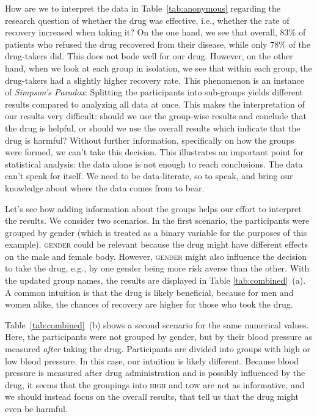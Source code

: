 \documentclass[nobib]{tufte-handout}
\begin{document}
How are we to interpret the data in Table~\ref{tab:anonymous} regarding the research question of whether the drug was effective, i.e., whether the rate of recovery increased when taking it?
On the one hand, we see that overall, 83\% of patients who refused the drug recovered from their disease, while only 78\% of the drug-takers did.
This does not bode well for our drug.
However, on the other hand, when we look at each group in isolation, we see that within each group, the drug-takers had a slightly higher recovery rate.
This phenomenon is an instance of \textit{Simpson's Paradox}: Splitting the participants into sub-groups yields different results compared to analyzing all data at once.
This makes the interpretation of our results very difficult: should we use the group-wise results and conclude that the drug is helpful, or should we use the overall results which indicate that the drug is harmful? 
Without further information, specifically on how the groups were formed, we can't take this decision.
This illustrates an important point for statistical analysis: the data alone is not enough to reach conclusions.
The data can't speak for itself. 
We need to be data-literate, so to speak, and bring our knowledge about where the data comes from to bear.

Let's see how adding information about the groups helps our effort to interpret the results. 
We consider two scenarios.
In the first scenario, the participants were grouped by gender (which is treated as a binary variable for the purposes of this example).
\textsc{gender} could be relevant because the drug might have different effects on the male and female body. 
However, \textsc{gender} might also influence the decision to take the drug, e.g., by one gender being more risk averse than the other. 
With the updated group names, the results are displayed in Table \ref{tab:combined}~(a).
A common intuition is that the drug is likely beneficial, because for men and women alike, the chances of recovery are higher for those who took the drug.


Table~\ref{tab:combined}~(b) shows a second scenario for the same numerical values.
Here, the participants were not grouped by gender, but by their blood pressure as measured \textit{after} taking the drug.
Participants are divided into groups with high or low blood pressure. 
In this case, our intuition is likely different. 
Because blood pressure is measured after drug administration and is possibly influenced by the drug, it seems that the groupings into \textsc{high} and \textsc{low} are not as informative, and we should instead focus on the overall results, that tell us that the drug might even be harmful.
\end{document}
